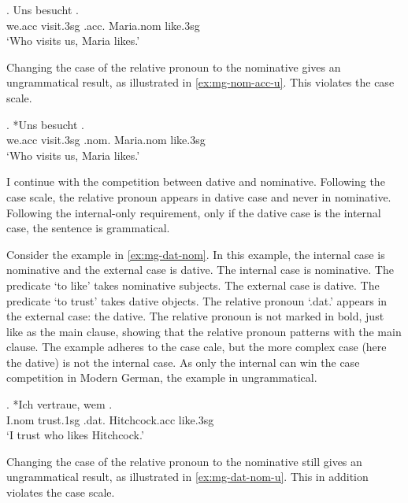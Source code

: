\exg. Uns besucht   .\\
 we.\ac{acc} visit.3\ac{sg}\scsub{[nom]} .\ac{acc}. Maria.\ac{nom} like.3\ac{sg}\scsub{[acc]}\\
 `Who visits us, Maria likes.' \label{ex:mg-nom-acc}

Changing the case of the relative pronoun to the nominative gives an ungrammatical result, as illustrated in \ref{ex:mg-nom-acc-u}. This violates the case scale.

\exg. *Uns besucht   .\\
 we.\ac{acc} visit.3\ac{sg}\scsub{[nom]} .\ac{nom}. Maria.\ac{nom} like.3\ac{sg}\scsub{[acc]}\\
 `Who visits us, Maria likes.' \label{ex:mg-nom-acc-u}

I continue with the competition between dative and nominative. Following the case scale, the relative pronoun appears in dative case and never in nominative. Following the internal-only requirement, only if the dative case is the internal case, the sentence is grammatical.

Consider the example in \ref{ex:mg-dat-nom}. In this example, the internal case is nominative and the external case is dative.
The internal case is nominative. The predicate  `to like' takes nominative subjects.
The external case is dative. The predicate  `to trust' takes dative objects.
The relative pronoun  `.\ac{dat}.' appears in the external case: the dative. The relative pronoun is not marked in bold, just like as the main clause, showing that the relative pronoun patterns with the main clause.
The example adheres to the case cale, but the more complex case (here the dative) is not the internal case. As only the internal can win the case competition in Modern German, the example in ungrammatical.

\exg. *Ich vertraue, wem  .\\
I.\ac{nom} trust.1\ac{sg}\scsub{[dat]} .\ac{dat}. Hitchcock.\ac{acc} like.3\ac{sg}\scsub{[nom]}\\
`I trust who likes Hitchcock.' \label{ex:mg-dat-nom}

Changing the case of the relative pronoun to the nominative still gives an ungrammatical result, as illustrated in \ref{ex:mg-dat-nom-u}. This in addition violates the case scale.

